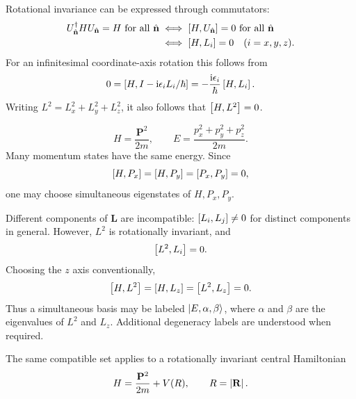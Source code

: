 Rotational invariance can be expressed through commutators:
\begin{align*}
 U_{\hat{\mathbf n}}^\dagger HU_{\hat{\mathbf n}}=H\ \text{for all }\hat{\mathbf n}
 &\iff\left[H,U_{\hat{\mathbf n}}\right]=0\ \text{for all }\hat{\mathbf n}\\
 &\iff\left[H,L_i\right]=0\quad(i=x,y,z).
\end{align*}
For an infinitesimal coordinate-axis rotation this follows from
\[
 0=\left[H,I-\mathrm{i}\epsilon_iL_i/\hbar\right]
 =-\frac{\mathrm{i}\epsilon_i}{\hbar}\left[H,L_i\right].
\]
Writing $L^2=L_x^2+L_y^2+L_z^2$, it also follows that
$\left[H,L^2\right]=0$.

\[
 H=\frac{\mathbf P^2}{2m},\qquad
 E=\frac{p_x^2+p_y^2+p_z^2}{2m}.
\]
Many momentum states have the same energy. Since
\[
 \left[H,P_x\right]=\left[H,P_y\right]=\left[P_x,P_y\right]=0,
\]
one may choose simultaneous eigenstates of $H,P_x,P_y$.

Different components of $\mathbf L$ are incompatible:
$\left[L_i,L_j\right]\ne0$ for distinct components in general. However,
$L^2$ is rotationally invariant, and
\[
 \left[L^2,L_i\right]=0.
\]
Choosing the $z$ axis conventionally,
\[
 \left[H,L^2\right]=\left[H,L_z\right]=\left[L^2,L_z\right]=0.
\]
Thus a simultaneous basis may be labeled $\lvert E,\alpha,\beta\rangle$, where
$\alpha$ and $\beta$ are the eigenvalues of $L^2$ and $L_z$.
Additional degeneracy labels are understood when required.

The same compatible set applies to a rotationally invariant central
Hamiltonian
\[
 H=\frac{\mathbf P^2}{2m}+V(R),\qquad R=\left\lvert\mathbf R\right\rvert.
\]
